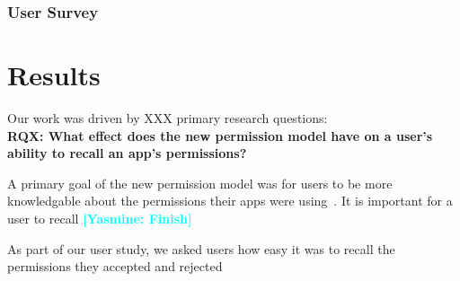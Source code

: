 \documentclass{sig-alternate-05-2015}
\newcommand{\todo}[1]{\textcolor{cyan}{\textbf{[#1]}}}
\begin{document}




\subsubsection{User Survey}



\section{Results}



Our work was driven by XXX primary research questions:\\

\textbf{RQX: What effect does the new permission model have on a user's ability to recall an app's permissions?}


A primary goal of the new permission model was for users to be more knowledgable about the permissions their apps were using~\cite{android_developer_URL}. It is important for a user to recall \todo{Yasmine: Finish}



As part of our user study, we asked users how easy it was to recall the permissions they accepted and rejected








\end{document}

